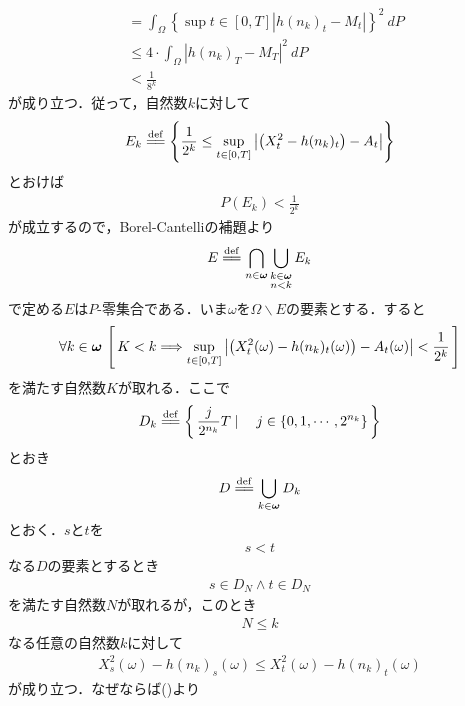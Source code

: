 \begin{sketch}
\begin{description}
\begin{align}
					&= \int_\Omega \left\{\sup{t \in [0,T]}{\left|h(n_k)_t - M_t\right|}\right\}^2\ dP \\
					&\leq 4 \cdot \int_\Omega \left|h(n_k)_T - M_T\right|^2\ dP \\
					&< \frac{1}{8^k}
				\end{align}
				が成り立つ．従って，自然数$k$に対して
				\begin{align}
					E_k \defeq \left\{ \frac{1}{2^k} \leq \sup{t \in [0,T]}{\left|\left(X^2_t - h(n_k)_t\right) - A_t\right|} \right\}
				\end{align}
				とおけば
				\begin{align}
					P(E_k) < \frac{1}{2^k}
				\end{align}
				が成立するので，Borel-Cantelliの補題より
				\begin{align}
					E \defeq \bigcap_{n \in \Natural} \bigcup_{\substack{k \in \Natural \\ n < k}} E_k
				\end{align}
				で定める$E$は$P$-零集合である．いま$\omega$を$\Omega \backslash E$の要素とする．すると
				\begin{align}
					\forall k \in {\boldsymbol \omega}\,
					\left[\, K < k \Longrightarrow \operatorname*{sup}_{t \in [0,T]} \left|\left(X^2_t(\omega) - h(n_k)_t(\omega)\right) - A_t(\omega)\right| < \frac{1}{2^k}\, \right]
					\label{fom:thm_decomposition_of_local_martingales_4}
				\end{align}
				を満たす自然数$K$が取れる．ここで
				\begin{align}
					D_k \defeq \Set{\frac{j}{2^{n_k}}T}{j \in \{0,1,\cdots,2^{n_k}\}}
				\end{align}
				とおき
				\begin{align}
					D \defeq \bigcup_{k \in \Natural} D_k
				\end{align}
				とおく．$s$と$t$を
				\begin{align}
					s < t
				\end{align}
				なる$D$の要素とするとき
				\begin{align}
					s \in D_N \wedge t \in D_N
				\end{align}
				を満たす自然数$N$が取れるが，このとき
				\begin{align}
					N \leq k
				\end{align}
				なる任意の自然数$k$に対して
				\begin{align}
					X^2_s(\omega) - h(n_k)_s(\omega) \leq X^2_t(\omega) - h(n_k)_t(\omega)
				\end{align}
				が成り立つ．なぜならば()より

\end{description}
\end{sketch}
